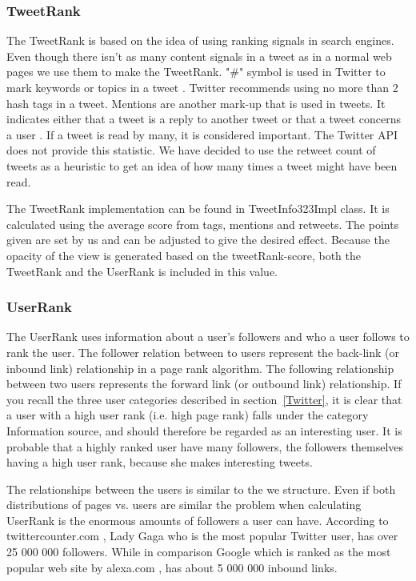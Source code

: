 \subsubsection{TweetRank}
The TweetRank is based on the idea of using ranking signals in search engines. Even though there isn't as many content signals in a tweet as in a normal web pages we use them to make the TweetRank. "\#" symbol is used in Twitter to mark keywords or topics in a tweet \citep{Twitter}. Twitter recommends using no more than 2 hash tags in a tweet. 
Mentions are another mark-up that is used in tweets. It indicates either that a tweet is a reply to another tweet or that a tweet concerns a user \citep{Twitterb}. If a tweet is read by many, it is considered important. The Twitter API does not provide this statistic. We have decided to use the retweet count of tweets as a heuristic to get an idea of how many times a tweet might have been read.

The TweetRank implementation can be found in TweetInfo323Impl class. It is calculated using the average score from tags, mentions and retweets. The points given are set by us and can be adjusted to give the desired effect. Because the opacity of the view is generated based on the tweetRank-score, both the TweetRank and the UserRank is included in this value. 

\subsubsection{UserRank}
The UserRank uses information about a user's followers and who a user follows to rank the user. The follower relation between to users represent the back-link (or inbound link) relationship in a page rank algorithm. The following relationship between two users represents the forward link (or outbound link) relationship. If you recall the three user categories described in section~\ref{Twitter}, it is clear that a user with a high user rank (i.e. high page rank) falls under the category Information source, and should therefore be regarded as an interesting user. It is probable that a highly ranked user have many followers, the followers themselves having a high user rank, because she makes interesting tweets.

The relationships between the users is similar to the we structure. Even if both distributions of pages vs. users are similar the problem when calculating UserRank is the enormous amounts of followers a user can have. According to twittercounter.com \citep{TwitterCounter}, Lady Gaga who is the most popular Twitter user, has over 25 000 000 followers. While in comparison Google which is ranked as the most popular web site by alexa.com \citet{AlexaInternet2012}, has about 5 000 000 inbound links. 

